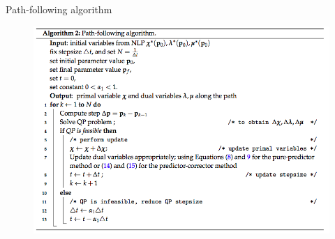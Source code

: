 \documentclass{beamer}
\begin{document}
\begin{frame}{Path-following algorithm}
	\begin{figure}[H]
		\includegraphics[scale=0.35]{pf_algo}
	\end{figure}
\end{frame}
\end{document}
